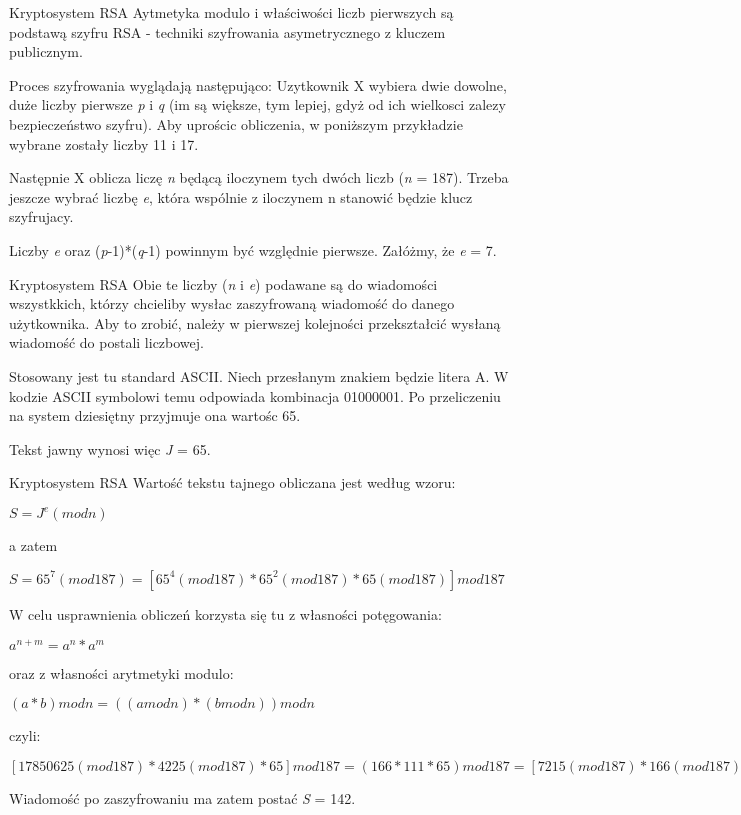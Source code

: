 \documentclass[10pt]{beamer}
\begin{document}
\begin{frame}{Kryptosystem RSA}
  Aytmetyka modulo i właściwości liczb pierwszych są podstawą szyfru RSA - techniki szyfrowania asymetrycznego z kluczem publicznym.
  
  Proces szyfrowania wyglądają następująco: Uzytkownik X wybiera dwie dowolne, duże liczby pierwsze \textit{p} i \textit{q} (im są większe, tym lepiej, gdyż od ich wielkosci zalezy bezpieczeństwo szyfru). Aby uprościc obliczenia, w poniższym przykładzie wybrane zostały liczby 11 i 17.
  
  Następnie X oblicza liczę \textit{n} będącą iloczynem tych dwóch liczb (\textit{n} = 187).
  Trzeba jeszcze wybrać liczbę \textit{e}, która wspólnie z iloczynem n stanowić będzie klucz szyfrujacy.
  
   Liczby \textit{e} oraz (\textit{p}-1)*(\textit{q}-1) powinnym być względnie pierwsze. Załóżmy, że \textit{e} = 7.

\end{frame}

\begin{frame}{Kryptosystem RSA}
	Obie te liczby (\textit{n} i \textit{e}) podawane są do wiadomości wszystkkich, którzy chcieliby wysłac zaszyfrowaną wiadomość do danego użytkownika.
     Aby to zrobić, należy w pierwszej kolejności przekształcić wysłaną wiadomość do postali liczbowej.

	Stosowany jest tu standard ASCII. Niech przesłanym znakiem będzie litera A. W kodzie ASCII symbolowi temu odpowiada kombinacja 01000001. Po przeliczeniu na system dziesiętny przyjmuje ona wartośc 65.
	
  Tekst jawny wynosi więc \textit{J} = 65.	
	
\end{frame}

\begin{frame}{Kryptosystem RSA}
	Wartość tekstu tajnego obliczana jest według wzoru:
	
	$S=J^e(mod\textit{n})$
	
	a zatem
	
	$S = 65^7(mod187)=[65^4(mod187)*65^2(mod187)*65(mod187)]mod187$
	
	W celu usprawnienia obliczeń korzysta się tu z własności potęgowania:
	
	$a^{n+m} = a^n * a^m$
	
	oraz z własności arytmetyki modulo:
	
	$(a*b)modn = ((a mod n)*(b mod n))mod n$
	
	czyli:
	
	$[17850625(mod187)*4225(mod187)*65]mod187 =
	(166*111*65)mod187=[7215(mod187)*166(mod187)]mod187=
	109*166(mod187)=142$
	
	Wiadomość po zaszyfrowaniu ma zatem postać \textit{S} = 142.
\end{frame}
\end{document}
